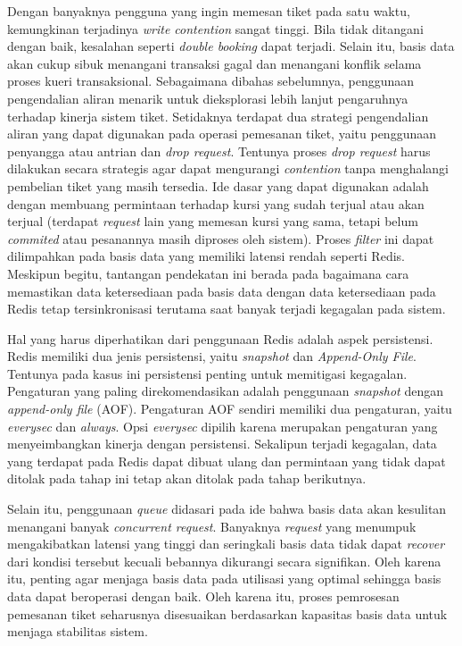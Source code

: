 Dengan banyaknya pengguna yang ingin memesan tiket pada satu waktu, kemungkinan terjadinya \textit{write contention} sangat tinggi. Bila tidak ditangani dengan baik, kesalahan seperti \textit{double booking} dapat terjadi. Selain itu, basis data akan cukup sibuk menangani transaksi gagal dan menangani konflik selama proses kueri transaksional. Sebagaimana dibahas sebelumnya, penggunaan pengendalian aliran menarik untuk dieksplorasi lebih lanjut pengaruhnya terhadap kinerja sistem tiket. Setidaknya terdapat dua strategi pengendalian aliran yang dapat digunakan pada operasi pemesanan tiket, yaitu penggunaan penyangga atau antrian dan \textit{drop request}. Tentunya proses \textit{drop request} harus dilakukan secara strategis agar dapat mengurangi \textit{contention} tanpa menghalangi pembelian tiket yang masih tersedia. Ide dasar yang dapat digunakan adalah dengan membuang permintaan terhadap kursi yang sudah terjual atau akan terjual (terdapat \textit{request} lain yang memesan kursi yang sama, tetapi belum \textit{commited} atau pesanannya masih diproses oleh sistem). Proses \textit{filter} ini dapat dilimpahkan pada basis data yang memiliki latensi rendah seperti Redis. Meskipun begitu, tantangan pendekatan ini berada pada bagaimana cara memastikan data ketersediaan pada basis data dengan data ketersediaan pada Redis tetap tersinkronisasi terutama saat banyak terjadi kegagalan pada sistem.

Hal yang harus diperhatikan dari penggunaan Redis adalah aspek persistensi. Redis memiliki dua jenis persistensi, yaitu \textit{snapshot} dan \textit{Append-Only File}. Tentunya pada kasus ini persistensi penting untuk memitigasi kegagalan. Pengaturan yang paling direkomendasikan adalah penggunaan \textit{snapshot} dengan \textit{append-only file} (AOF). Pengaturan AOF sendiri memiliki dua pengaturan, yaitu \textit{everysec} dan \textit{always}. Opsi \textit{everysec} dipilih karena merupakan pengaturan yang menyeimbangkan kinerja dengan persistensi. Sekalipun terjadi kegagalan, data yang terdapat pada Redis dapat dibuat ulang dan permintaan yang tidak dapat ditolak pada tahap ini tetap akan ditolak pada tahap berikutnya.

Selain itu, penggunaan \textit{queue} didasari pada ide bahwa basis data akan kesulitan menangani banyak \textit{concurrent request}. Banyaknya \textit{request} yang menumpuk mengakibatkan latensi yang tinggi dan seringkali basis data tidak dapat \textit{recover} dari kondisi tersebut kecuali bebannya dikurangi secara signifikan. Oleh karena itu, penting agar menjaga basis data pada utilisasi yang optimal sehingga basis data dapat beroperasi dengan baik. Oleh karena itu, proses pemrosesan pemesanan tiket seharusnya disesuaikan berdasarkan kapasitas basis data untuk menjaga stabilitas sistem.

